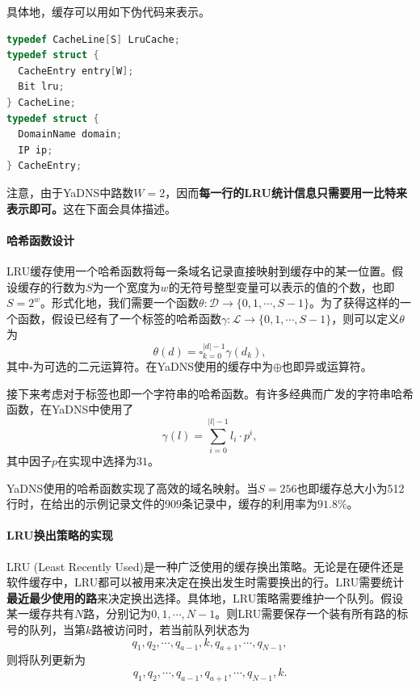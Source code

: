 具体地，缓存可以用如下伪代码来表示。

\begin{lstlisting}[language=C]
typedef CacheLine[S] LruCache;
typedef struct {
  CacheEntry entry[W];
  Bit lru;
} CacheLine;
typedef struct {
  DomainName domain;
  IP ip;
} CacheEntry;
\end{lstlisting}

注意，由于YaDNS中路数$W = 2$，因而\textbf{每一行的LRU统计信息只需要用一比特来表示即可。}这在下面会具体描述。

\paragraph{哈希函数设计}

LRU缓存使用一个哈希函数将每一条域名记录直接映射到缓存中的某一位置。假设缓存的行数为$S$为一个宽度为$w$的无符号整型变量可以表示的值的个数，也即$S = 2^w$。形式化地，我们需要一个函数$\theta : \mathcal D \rightarrow \{ 0, 1, \cdots, S - 1 \}$。为了获得这样的一个函数，假设已经有了一个标签的哈希函数$\gamma : \mathcal L \rightarrow \{ 0, 1, \cdots, S - 1 \}$，则可以定义$\theta$为
\begin{equation}
  \theta(d) = \square_{k=0}^{|d| - 1} \gamma(d_k),
\end{equation}
其中$\square$为可选的二元运算符。在YaDNS使用的缓存中为$\oplus$也即异或运算符。

接下来考虑对于标签也即一个字符串的哈希函数。有许多经典而广发的字符串哈希函数，在YaDNS中使用了
\begin{equation}
  \gamma(l) = \sum_{i=0}^{|l| - 1} l_i \cdot p^i,
\end{equation}
其中因子$p$在实现中选择为$31$。

YaDNS使用的哈希函数实现了高效的域名映射。当$S = 256$也即缓存总大小为512行时，在给出的示例记录文件的909条记录中，缓存的利用率为$91.8\%$。

\paragraph{LRU换出策略的实现}

LRU (Least Recently Used)是一种广泛使用的缓存换出策略。无论是在硬件还是软件缓存中，LRU都可以被用来决定在换出发生时需要换出的行。LRU需要统计\textbf{最近最少使用的路}来决定换出选择。具体地，LRU策略需要维护一个队列。假设某一缓存共有$N$路，分别记为$0, 1, \cdots, N-1$。则LRU需要保存一个装有所有路的标号的队列，当第$k$路被访问时，若当前队列状态为
\begin{equation}
q_1, q_2, \cdots, q_{a-1}, k, q_{a+1}, \cdots, q_{N-1},
\end{equation}
则将队列更新为
\begin{equation}
q_1, q_2, \cdots, q_{a-1}, q_{a+1}, \cdots, q_{N-1}, k.
\end{equation}

